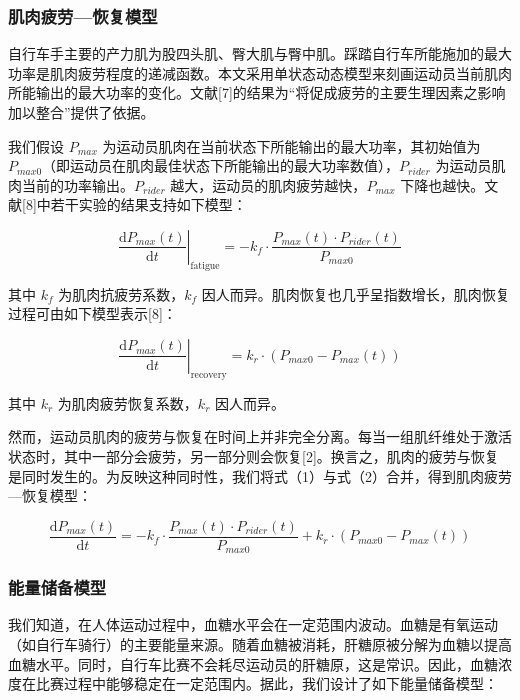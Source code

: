 \documentclass[11pt,a4paper]{ctexart}
\begin{document}
\subsubsection{肌肉疲劳—恢复模型}

自行车手主要的产力肌为股四头肌、臀大肌与臀中肌。踩踏自行车所能施加的最大功率是肌肉疲劳程度的递减函数。本文采用单状态动态模型来刻画运动员当前肌肉所能输出的最大功率的变化。文献[7]的结果为“将促成疲劳的主要生理因素之影响加以整合”提供了依据。

我们假设 $P_{max}$ 为运动员肌肉在当前状态下所能输出的最大功率，其初始值为 $P_{max0}$（即运动员在肌肉最佳状态下所能输出的最大功率数值），$P_{rider}$ 为运动员肌肉当前的功率输出。$P_{rider}$ 越大，运动员的肌肉疲劳越快，$P_{max}$ 下降也越快。文献[8]中若干实验的结果支持如下模型：

\begin{equation}
\left.\frac{\mathrm{d}P_{max}(t)}{\mathrm{d}t}\right|_{\text{fatigue}}
= -k_f\cdot\frac{P_{max}(t)\cdot P_{rider}(t)}{P_{max0}}
\end{equation}

其中 $k_f$ 为肌肉抗疲劳系数，$k_f$ 因人而异。肌肉恢复也几乎呈指数增长，肌肉恢复过程可由如下模型表示[8]：

\begin{equation}
\left.\frac{\mathrm{d}P_{max}(t)}{\mathrm{d}t}\right|_{\text{recovery}}
= k_r\cdot\left(P_{max0}-P_{max}(t)\right)
\end{equation}

其中 $k_r$ 为肌肉疲劳恢复系数，$k_r$ 因人而异。

然而，运动员肌肉的疲劳与恢复在时间上并非完全分离。每当一组肌纤维处于激活状态时，其中一部分会疲劳，另一部分则会恢复[2]。换言之，肌肉的疲劳与恢复是同时发生的。为反映这种同时性，我们将式（1）与式（2）合并，得到肌肉疲劳—恢复模型：

\begin{equation}
\frac{\mathrm{d}P_{max}(t)}{\mathrm{d}t}
= -k_f\cdot\frac{P_{max}(t)\cdot P_{rider}(t)}{P_{max0}}
+ k_r\cdot\left(P_{max0}-P_{max}(t)\right)
\end{equation}

\subsubsection{能量储备模型}

我们知道，在人体运动过程中，血糖水平会在一定范围内波动。血糖是有氧运动（如自行车骑行）的主要能量来源。随着血糖被消耗，肝糖原被分解为血糖以提高血糖水平。同时，自行车比赛不会耗尽运动员的肝糖原，这是常识。因此，血糖浓度在比赛过程中能够稳定在一定范围内。据此，我们设计了如下能量储备模型：
\end{document}
